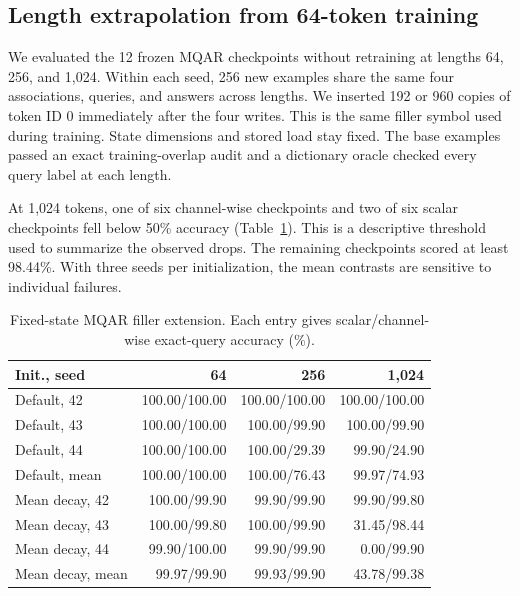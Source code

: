 \documentclass[conference]{IEEEtran}
\begin{document}
\subsection{Length extrapolation from 64-token training}
We evaluated the 12 frozen MQAR checkpoints without retraining at lengths 64, 256, and 1,024. Within each seed, 256 new examples share the same four associations, queries, and answers across lengths. We inserted 192 or 960 copies of token ID 0 immediately after the four writes. This is the same filler symbol used during training. State dimensions and stored load stay fixed. The base examples passed an exact training-overlap audit and a dictionary oracle checked every query label at each length.

At 1,024 tokens, one of six channel-wise checkpoints and two of six scalar checkpoints fell below 50\% accuracy (Table~\ref{tab:length}). This is a descriptive threshold used to summarize the observed drops. The remaining checkpoints scored at least 98.44\%. With three seeds per initialization, the mean contrasts are sensitive to individual failures. 

\begin{table}[t]
\caption{Fixed-state MQAR filler extension. Each entry gives scalar/channel-wise exact-query accuracy (\%).}
\label{tab:length}
\centering
\scriptsize
\setlength{\tabcolsep}{4pt}
\begin{tabular}{lrrr}
\toprule
Init., seed & 64 & 256 & 1,024 \\
\midrule
Default, 42 & 100.00/100.00 & 100.00/100.00 & 100.00/100.00 \\
Default, 43 & 100.00/100.00 & 100.00/99.90 & 100.00/99.90 \\
Default, 44 & 100.00/100.00 & 100.00/29.39 & 99.90/24.90 \\
Default, mean & 100.00/100.00 & 100.00/76.43 & 99.97/74.93 \\
\midrule
Mean decay, 42 & 100.00/99.90 & 99.90/99.90 & 99.90/99.80 \\
Mean decay, 43 & 100.00/99.80 & 100.00/99.90 & 31.45/98.44 \\
Mean decay, 44 & 99.90/100.00 & 99.90/99.90 & 0.00/99.90 \\
Mean decay, mean & 99.97/99.90 & 99.93/99.90 & 43.78/99.38 \\
\bottomrule
\end{tabular}
\end{table}
\end{document}
